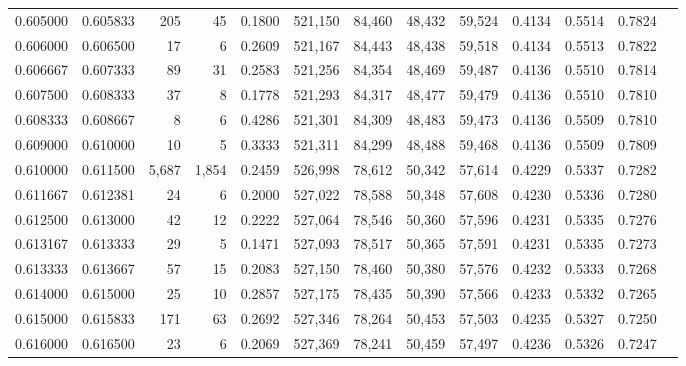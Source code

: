 \begin{tabular}{rrrrrrrrrrrrr}
0.605000 & 0.605833 &    205 &    45 &                                     0.1800 & 521,150 &  84,460 &  48,432 &  59,524 & 0.4134 & 0.5514 & 0.7824 \\
0.606000 & 0.606500 &     17 &     6 &                                     0.2609 & 521,167 &  84,443 &  48,438 &  59,518 & 0.4134 & 0.5513 & 0.7822 \\
0.606667 & 0.607333 &     89 &    31 &                                     0.2583 & 521,256 &  84,354 &  48,469 &  59,487 & 0.4136 & 0.5510 & 0.7814 \\
0.607500 & 0.608333 &     37 &     8 &                                     0.1778 & 521,293 &  84,317 &  48,477 &  59,479 & 0.4136 & 0.5510 & 0.7810 \\
0.608333 & 0.608667 &      8 &     6 &                                     0.4286 & 521,301 &  84,309 &  48,483 &  59,473 & 0.4136 & 0.5509 & 0.7810 \\
0.609000 & 0.610000 &     10 &     5 &                                     0.3333 & 521,311 &  84,299 &  48,488 &  59,468 & 0.4136 & 0.5509 & 0.7809 \\
0.610000 & 0.611500 &  5,687 & 1,854 &                                     0.2459 & 526,998 &  78,612 &  50,342 &  57,614 & 0.4229 & 0.5337 & 0.7282 \\
0.611667 & 0.612381 &     24 &     6 &                                     0.2000 & 527,022 &  78,588 &  50,348 &  57,608 & 0.4230 & 0.5336 & 0.7280 \\
0.612500 & 0.613000 &     42 &    12 &                                     0.2222 & 527,064 &  78,546 &  50,360 &  57,596 & 0.4231 & 0.5335 & 0.7276 \\
0.613167 & 0.613333 &     29 &     5 &                                     0.1471 & 527,093 &  78,517 &  50,365 &  57,591 & 0.4231 & 0.5335 & 0.7273 \\
0.613333 & 0.613667 &     57 &    15 &                                     0.2083 & 527,150 &  78,460 &  50,380 &  57,576 & 0.4232 & 0.5333 & 0.7268 \\
0.614000 & 0.615000 &     25 &    10 &                                     0.2857 & 527,175 &  78,435 &  50,390 &  57,566 & 0.4233 & 0.5332 & 0.7265 \\
0.615000 & 0.615833 &    171 &    63 &                                     0.2692 & 527,346 &  78,264 &  50,453 &  57,503 & 0.4235 & 0.5327 & 0.7250 \\
0.616000 & 0.616500 &     23 &     6 &                                     0.2069 & 527,369 &  78,241 &  50,459 &  57,497 & 0.4236 & 0.5326 & 0.7247 \\

\end{tabular}
